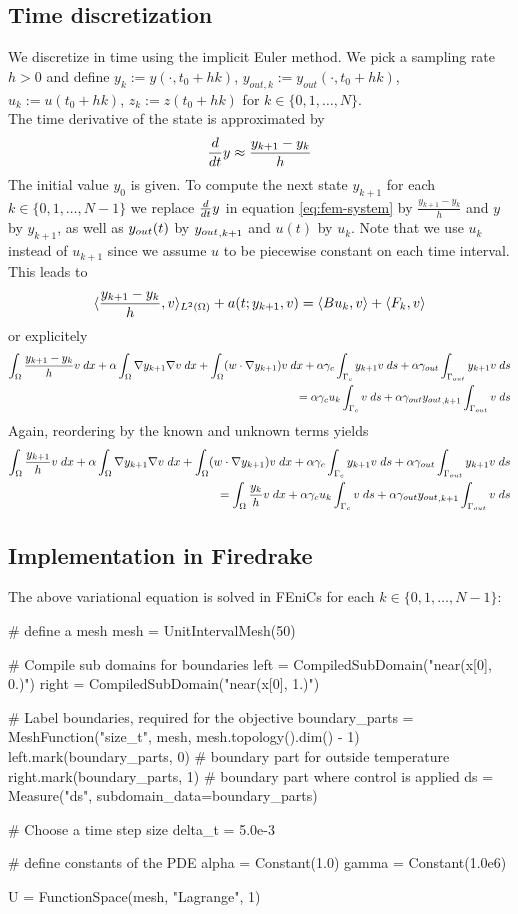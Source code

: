 \documentclass[
12pt, %
a4paper, %
onecolumn, %
portrait %
]{article}
\begin{document}
\subsection{Time discretization}
We discretize in time using the implicit Euler method. We pick a sampling rate $h > 0$ and define $y_k := y(\cdot, t_0 + h k)$, $y_{out,k} := y_{out}(\cdot, t_0 + h k) $, $u_k := u(t_0 + h k)$, $z_k := z(t_0 + h k)$ for $k \in \{0, 1, \hdots, N\}$. \\
The time derivative of the state is approximated by
\begin{equation}
\frac{d}{dt}{y} \approx \frac{y_{k+1} - y_k}{h}
\end{equation}
The initial value $y_0$ is given. To compute the next state $y_{k+1}$ for each $k \in \{0, 1, \hdots, N-1\}$  we replace $\frac{d}{dt}{y}$ in equation \eqref{eq:fem-system} by $\frac{y_{k+1} - y_k}{h}$ and $y$ by $y_{k+1}$, as well as ${y_{out}}(t)$ by ${y_{out}}_{,k+1}$ and $u(t)$ by $u_{k}$. Note that we use $u_k$ instead of $u_{k+1}$ since we assume $u$ to be piecewise constant on each time interval.
This leads to 
\begin{equation}
\langle{\frac{y_{k+1} - y_k}{h}},{v}\rangle_{L^2(\Omega)} + a(t; {y_{k+1}},{v}) = \langle B {u_k}, {v} \rangle + \langle F_k, {v} \rangle
\end{equation}
or explicitely
\begin{align*}
\int_{\Omega} {\frac{y_{k+1} - y_k}{h}}{v} \; dx + \alpha \int_{\Omega} {\nabla {y_{k+1}}}{\nabla {v}} \; dx + \int_{\Omega} (w \cdot \nabla {y_{k+1}}) {v} \; dx + \alpha\gamma_{c} \int_{\Gamma_{c}} {{y_{k+1}}}{{v}} \; ds + \alpha \gamma_{out} \int_{\Gamma_{out}} {{y_{k+1}}}{{v}} \; ds \\= \alpha \gamma_{c} {u_k} \int_{\Gamma_{c}} {}{v} \; ds + \alpha \gamma_{out} {{y_{out}}_{,k+1}} \int_{\Gamma_{out}} {}{v} \; ds
\end{align*}
Again, reordering by the known and unknown terms yields
\begin{align*}
\int_{\Omega} {\frac{y_{k+1}}{h}}{v} \; dx + \alpha \int_{\Omega} {\nabla {y_{k+1}}}{\nabla {v}} \; dx + \int_{\Omega} (w \cdot \nabla {y_{k+1}}) {v} \; dx + \alpha\gamma_{c} \int_{\Gamma_{c}} {{y_{k+1}}}{{v}} \; ds + \alpha \gamma_{out} \int_{\Gamma_{out}} {{y_{k+1}}}{{v}} \; ds \\= \int_{\Omega} {\frac{y_k}{h}}{v} \; dx + \alpha \gamma_{c} {u_k} \int_{\Gamma_{c}} {}{v} \; ds + \alpha \gamma_{out} {{y_{out}}_{,k+1}} \int_{\Gamma_{out}} {}{v} \; ds
\end{align*}

\subsection{Implementation in Firedrake}
The above variational equation is solved in FEniCs for each $k \in \{0, 1, \hdots, N-1\}$:
\begin{python}
# define a mesh
mesh = UnitIntervalMesh(50)

# Compile sub domains for boundaries
left = CompiledSubDomain("near(x[0], 0.)")
right = CompiledSubDomain("near(x[0], 1.)")

# Label boundaries, required for the objective
boundary_parts = MeshFunction("size_t", mesh, mesh.topology().dim() - 1)
left.mark(boundary_parts, 0)  # boundary part for outside temperature
right.mark(boundary_parts, 1)  # boundary part where control is applied
ds = Measure("ds", subdomain_data=boundary_parts)

# Choose a time step size
delta_t = 5.0e-3

# define constants of the PDE
alpha = Constant(1.0)
gamma = Constant(1.0e6)

U = FunctionSpace(mesh, "Lagrange", 1)
\end{python}
\end{document}
